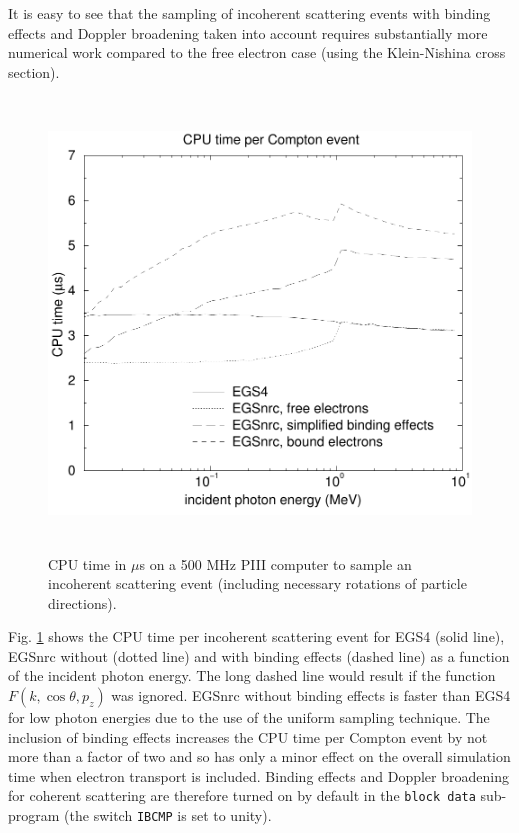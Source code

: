 It is easy to see that the sampling of incoherent scattering events
with binding effects and Doppler broadening taken into account
requires substantially more numerical work compared to
the free electron case (using the Klein-Nishina cross section).
\begin{figure}[h]
\includegraphics[height=12cm,width=12cm]{figures/comp_times}
\caption[CPU times for Compton sampling]{\label{comp_times}
CPU time in $\mu$s on a 500 MHz PIII computer to sample an incoherent
scattering event (including necessary rotations of particle directions).}
\end{figure}
Fig. \ref{comp_times} shows the CPU time per incoherent scattering event
for EGS4 (solid line), EGSnrc without (dotted line)
and with binding effects (dashed line) as a function of the incident
photon energy. The long dashed line would result if the function
$F(k,\cos \theta,p_z)$ was ignored. EGSnrc without binding effects is
faster than EGS4 for low photon energies due to the use of
the uniform sampling technique. The inclusion of binding effects
increases the CPU time per Compton event by not more than a
factor of two and so has only a minor effect on the overall simulation
time when electron transport is included. Binding effects and
Doppler broadening for coherent scattering are therefore turned
on by default in the {\tt block data} sub-program (the switch
{\tt IBCMP} is set to unity).

